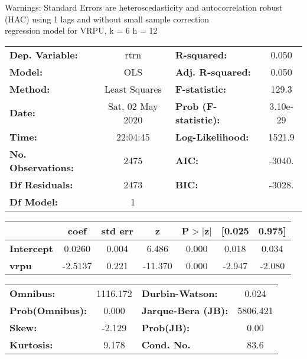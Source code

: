 Warnings: \newline
 [1] Standard Errors are heteroscedasticity and autocorrelation robust (HAC) using 1 lags and without small sample correction\\ 

regression model for VRPU, k = 6 h = 12\begin{center}
\begin{tabular}{lclc}
\toprule
\textbf{Dep. Variable:}    &       rtrn       & \textbf{  R-squared:         } &     0.050   \\
\textbf{Model:}            &       OLS        & \textbf{  Adj. R-squared:    } &     0.050   \\
\textbf{Method:}           &  Least Squares   & \textbf{  F-statistic:       } &     129.3   \\
\textbf{Date:}             & Sat, 02 May 2020 & \textbf{  Prob (F-statistic):} &  3.10e-29   \\
\textbf{Time:}             &     22:04:45     & \textbf{  Log-Likelihood:    } &    1521.9   \\
\textbf{No. Observations:} &        2475      & \textbf{  AIC:               } &    -3040.   \\
\textbf{Df Residuals:}     &        2473      & \textbf{  BIC:               } &    -3028.   \\
\textbf{Df Model:}         &           1      & \textbf{                     } &             \\
\bottomrule
\end{tabular}
\begin{tabular}{lcccccc}
                   & \textbf{coef} & \textbf{std err} & \textbf{z} & \textbf{P$> |$z$|$} & \textbf{[0.025} & \textbf{0.975]}  \\
\midrule
\textbf{Intercept} &       0.0260  &        0.004     &     6.486  &         0.000        &        0.018    &        0.034     \\
\textbf{vrpu}      &      -2.5137  &        0.221     &   -11.370  &         0.000        &       -2.947    &       -2.080     \\
\bottomrule
\end{tabular}
\begin{tabular}{lclc}
\textbf{Omnibus:}       & 1116.172 & \textbf{  Durbin-Watson:     } &    0.024  \\
\textbf{Prob(Omnibus):} &   0.000  & \textbf{  Jarque-Bera (JB):  } & 5806.421  \\
\textbf{Skew:}          &  -2.129  & \textbf{  Prob(JB):          } &     0.00  \\
\textbf{Kurtosis:}      &   9.178  & \textbf{  Cond. No.          } &     83.6  \\
\bottomrule
\end{tabular}
\end{center}

